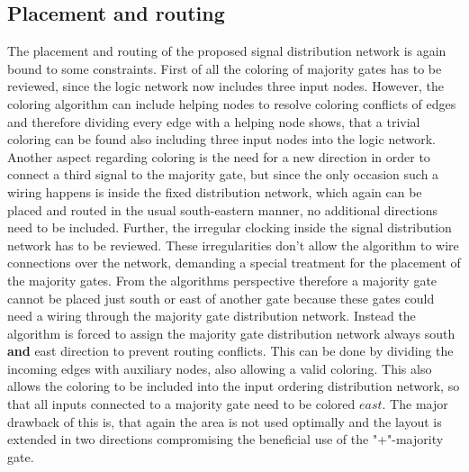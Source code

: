 \subsection{Placement and routing}
The placement and routing of the proposed signal distribution network is again bound to some constraints. First of all the coloring of majority gates has to be reviewed, since the logic network now includes three input nodes. However, the coloring algorithm can include helping nodes to resolve coloring conflicts of edges and therefore dividing every edge with a helping node shows, that a trivial coloring can be found also including three input nodes into the logic network. Another aspect regarding coloring is the need for a new direction in order to connect a third signal to the majority gate, but since the only occasion such a wiring happens is inside the fixed distribution network, which again can be placed and routed in the usual south-eastern manner, no additional directions need to be included. Further, the irregular clocking inside the signal distribution network has to be reviewed. These irregularities don't allow the algorithm to wire connections over the network, demanding a special treatment for the placement of the majority gates. From the algorithms perspective therefore a majority gate cannot be placed just south or east of another gate because these gates could need a wiring through the majority gate distribution network. Instead the algorithm is forced to assign the majority gate distribution network always south \textbf{and} east direction to prevent routing conflicts. This can be done by dividing the incoming edges with auxiliary nodes, also allowing a valid coloring. This also allows the coloring to be included into the input ordering distribution network, so that all inputs connected to a majority gate need to be colored $east$. The major drawback of this is, that again the area is not used optimally and the layout is extended in two directions compromising the beneficial use of the "+"-majority gate.

